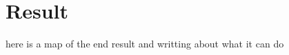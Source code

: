 \chapter{Result}

here is a map of the end result and writting about what it can do

\citep{Write this}